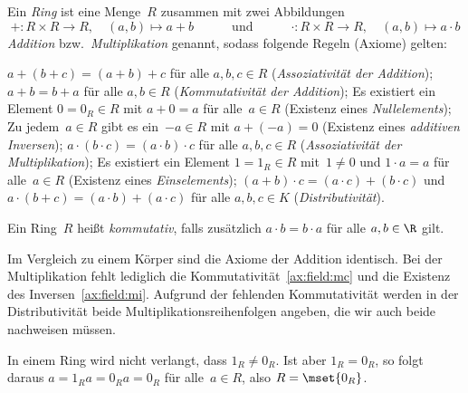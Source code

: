 \documentclass[a4paper]{article}
\begin{document}
\begin{definition}[Ring]
    Ein \emph{Ring} ist eine Menge~$R$ zusammen mit zwei Abbildungen
    \begin{equation*}
        +\colon R \times R \to R,\quad (a, b) \mapsto a+b \quad\qquad\text{und}\qquad\quad \cdot\colon R \times R \to R,\quad (a, b) \mapsto a \cdot b
    \end{equation*}
    \emph{Addition} bzw.\ \emph{Multiplikation} genannt, sodass folgende Regeln (Axiome) gelten:
    \begin{enumerate}[leftmargin=*, widest=(A1)]
         $a+(b+c) = (a+b)+c$ für alle $a, b, c \in R$ (\emph{Assoziativität der Addition});\label{ax:ring:aa}
         $a+b = b+a$ für alle $a, b \in R$ (\emph{Kommutativität der Addition});\label{ax:ring:ac}
         Es existiert ein Element $0 = 0_R \in R$ mit $a+0 = a$ für alle~$a \in R$ (Existenz eines \emph{Nullelements});\label{ax:ring:an}
         Zu jedem~$a \in R$ gibt es ein~$-a \in R$ mit $a+(-a) = 0$ (Existenz eines \emph{additiven Inversen});\label{ax:ring:ai}
         $a\cdot(b\cdot c) = (a\cdot b)\cdot c$ für alle $a, b, c \in R$ (\emph{Assoziativität der Multiplikation});\label{ax:ring:ma}
         Es existiert ein Element $1 = 1_R \in R$ mit~$1 \neq 0$ und $1\cdot a = a$ für alle~$a \in R$ (Existenz eines \emph{Einselements});\label{ax:ring:mn}
         $(a+b)\cdot c = (a\cdot c)+(b\cdot c)$ und $a\cdot(b+c) = (a\cdot b)+(a\cdot c)$ für alle $a, b, c \in K$ (\emph{Distributivität}).\label{ax:ring:d}
    \end{enumerate}
\end{definition}

\begin{definition}
    Ein Ring~$R$ heißt \emph{kommutativ}, falls zusätzlich $a\cdot b = b\cdot a$ für alle $a, b \in \R$ gilt.
\end{definition}

\begin{remark}
    Im Vergleich zu einem Körper sind die Axiome der Addition identisch. Bei der Multiplikation fehlt lediglich die Kommutativität~\ref{ax:field:mc} und die Existenz des Inversen~\ref{ax:field:mi}. Aufgrund der fehlenden Kommutativität werden in der Distributivität beide Multiplikationsreihenfolgen angeben, die wir auch beide nachweisen müssen.
\end{remark}

\begin{remark}
    In einem Ring wird nicht verlangt, dass $1_R \neq 0_R$. Ist aber $1_R = 0_R$, so folgt daraus $a = 1_R a = 0_R a = 0_R$ für alle~$a \in R$, also $R = \mset{0_R}$.
\end{remark}
\end{document}
